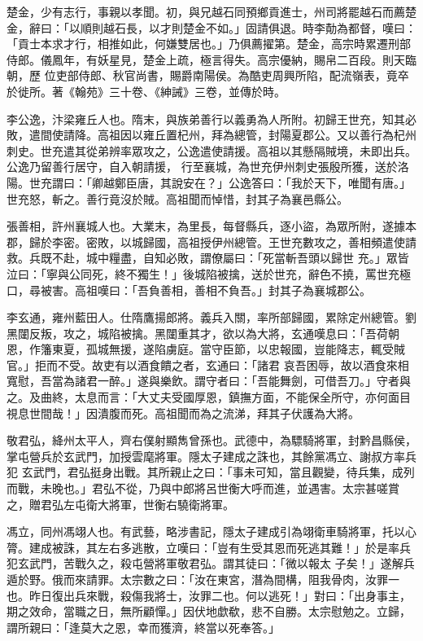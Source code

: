 \begin{pinyinscope}
 楚金，少有志行，事親以孝聞。初，與兄越石同預鄉貢進士，州司將罷越石而薦楚金，辭曰：「以順則越石長，以才則楚金不如。」固請俱退。時李勣為都督，嘆曰：「貢士本求才行，相推如此，何嫌雙居也。」乃俱薦擢第。楚金，高宗時累遷刑部侍郎。儀鳳年，有妖星見，楚金上疏，極言得失。高宗優納，賜帛二百段。則天臨朝，歷
 位吏部侍郎、秋官尚書，賜爵南陽侯。為酷吏周興所陷，配流嶺表，竟卒於徙所。著《翰苑》三十卷、《紳誡》三卷，並傳於時。



 李公逸，汴梁雍丘人也。隋末，與族弟善行以義勇為人所附。初歸王世充，知其必敗，遣間使請降。高祖因以雍丘置杞州，拜為總管，封陽夏郡公。又以善行為杞州刺史。世充遣其從弟辨率眾攻之，公逸遣使請援。高祖以其懸隔賊境，未即出兵。公逸乃留善行居守，自入朝請援，
 行至襄城，為世充伊州刺史張殷所獲，送於洛陽。世充謂曰：「卿越鄭臣唐，其說安在？」公逸答曰：「我於天下，唯聞有唐。」世充怒，斬之。善行竟沒於賊。高祖聞而悼惜，封其子為襄邑縣公。



 張善相，許州襄城人也。大業末，為里長，每督縣兵，逐小盜，為眾所附，遂據本郡，歸於李密。密敗，以城歸國，高祖授伊州總管。王世充數攻之，善相頻遣使請救。兵既不赴，城中糧盡，自知必敗，謂僚屬曰：「死當斬吾頭以歸世
 充。」眾皆泣曰：「寧與公同死，終不獨生！」後城陷被擒，送於世充，辭色不撓，罵世充極口，尋被害。高祖嘆曰：「吾負善相，善相不負吾。」封其子為襄城郡公。



 李玄通，雍州藍田人。仕隋鷹揚郎將。義兵入關，率所部歸國，累除定州總管。劉黑闥反叛，攻之，城陷被擒。黑闥重其才，欲以為大將，玄通嘆息曰：「吾荷朝恩，作籓東夏，孤城無援，遂陷虜庭。當守臣節，以忠報國，豈能降志，輒受賊官。」拒而不受。故吏有以酒食饋之者，玄通曰：「諸君
 哀吾困辱，故以酒食來相寬慰，吾當為諸君一醉。」遂與樂飲。謂守者曰：「吾能舞劍，可借吾刀。」守者與之。及曲終，太息而言：「大丈夫受國厚恩，鎮撫方面，不能保全所守，亦何面目視息世間哉！」因潰腹而死。高祖聞而為之流涕，拜其子伏護為大將。



 敬君弘，絳州太平人，齊右僕射顯雋曾孫也。武德中，為驃騎將軍，封黔昌縣侯，掌屯營兵於玄武門，加授雲麾將軍。隱太子建成之誅也，其餘黨馮立、謝叔方率兵犯
 玄武門，君弘挺身出戰。其所親止之曰：「事未可知，當且觀變，待兵集，成列而戰，未晚也。」君弘不從，乃與中郎將呂世衡大呼而進，並遇害。太宗甚嗟賞之，贈君弘左屯衛大將軍，世衡右驍衛將軍。



 馮立，同州馮翊人也。有武藝，略涉書記，隱太子建成引為翊衛車騎將軍，托以心膂。建成被誅，其左右多逃散，立嘆曰：「豈有生受其恩而死逃其難！」於是率兵犯玄武門，苦戰久之，殺屯營將軍敬君弘。謂其徒曰：「微以報太
 子矣！」遂解兵遁於野。俄而來請罪。太宗數之曰：「汝在東宮，潛為間構，阻我骨肉，汝罪一也。昨日復出兵來戰，殺傷我將士，汝罪二也。何以逃死！」對曰：「出身事主，期之效命，當職之日，無所顧憚。」因伏地歔欷，悲不自勝。太宗慰勉之。立歸，謂所親曰：「逢莫大之恩，幸而獲濟，終當以死奉答。」




\end{pinyinscope}
